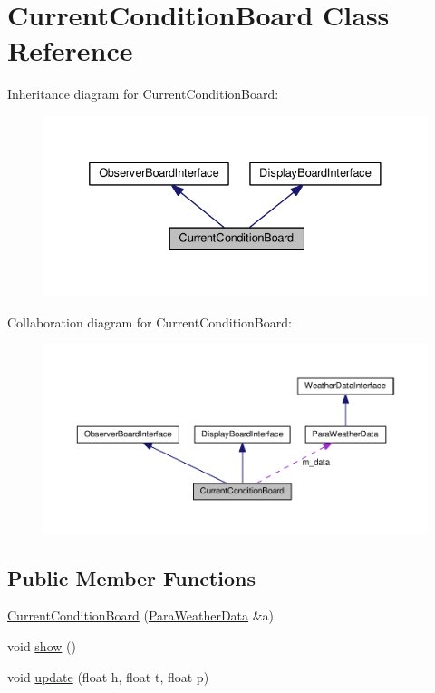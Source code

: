 \hypertarget{classCurrentConditionBoard}{}\section{Current\+Condition\+Board Class Reference}
\label{classCurrentConditionBoard}


Inheritance diagram for Current\+Condition\+Board\+:
\nopagebreak
\begin{figure}[H]
\begin{center}
\leavevmode
\includegraphics[width=332pt]{classCurrentConditionBoard__inherit__graph}
\end{center}
\end{figure}


Collaboration diagram for Current\+Condition\+Board\+:
\nopagebreak
\begin{figure}[H]
\begin{center}
\leavevmode
\includegraphics[width=350pt]{classCurrentConditionBoard__coll__graph}
\end{center}
\end{figure}
\subsection*{Public Member Functions}
\begin{DoxyCompactItemize}
\item 
\hyperlink{classCurrentConditionBoard_ae25ee112ee83575673b3e4f8448f1da7}{Current\+Condition\+Board} (\hyperlink{classParaWeatherData}{Para\+Weather\+Data} \&a)
\item 
void \hyperlink{classCurrentConditionBoard_a5cd2077415a0e7019c15bc0f28cfb7fe}{show} ()
\item 
void \hyperlink{classCurrentConditionBoard_a3d7bea56331de46f30db9e93f8f2c7d3}{update} (float h, float t, float p)
\end{DoxyCompactItemize}
